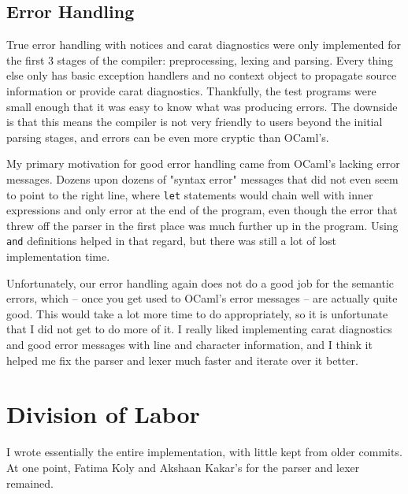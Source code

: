 \subsection{Error Handling}
True error handling with notices and carat diagnostics were only implemented for the first 3 stages of the compiler: preprocessing, lexing and parsing. Every thing else only has basic exception handlers and no context object to propagate source information or provide carat diagnostics. Thankfully, the test programs were small enough that it was easy to know what was producing errors. The downside is that this means the compiler is not very friendly to users beyond the initial parsing stages, and errors can be even more cryptic than OCaml's.

My primary motivation for good error handling came from OCaml's lacking error messages. Dozens upon dozens of "syntax error" messages that did not even seem to point to the right line, where \lstinline|let| statements would chain well with inner expressions and only error at the end of the program, even though the error that threw off the parser in the first place was much further up in the program. Using \lstinline|and| definitions helped in that regard, but there was still a lot of lost implementation time.

Unfortunately, our error handling again does not do a good job for the semantic errors, which -- once you get used to OCaml's error messages -- are actually quite good. This would take a lot more time to do appropriately, so it is unfortunate that I did not get to do more of it. I really liked implementing carat diagnostics and good error messages with line and character information, and I think it helped me fix the parser and lexer much faster and iterate over it better.

\section{Division of Labor}
I wrote essentially the entire implementation, with little kept from older commits. At one point, Fatima Koly and Akshaan Kakar's for the parser and lexer remained.